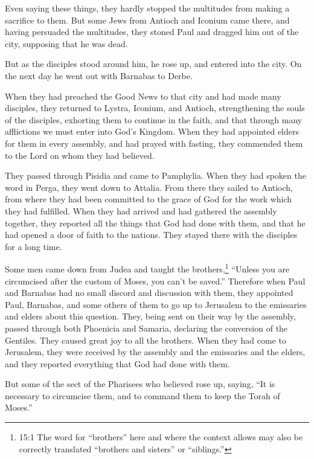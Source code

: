 \myverse{}Even saying these things, they hardly stopped the multitudes
from making a sacrifice to them.
\myverse{}But some Jews from Antioch and Iconium came there, and having persuaded the
multitudes, they stoned Paul and dragged him out of the city, supposing that he was dead.

\myverse{}But as the disciples stood around him, he rose up, and entered
into the city. On the next day he went out with Barnabas to Derbe.

\myverse{}When they had preached the Good News to that city and had made
many disciples, they returned to Lystra, Iconium, and Antioch,
\myverse{}strengthening the souls of the disciples, exhorting them to continue in the
faith, and that through many afflictions we must enter into God’s Kingdom.
\myverse{}When they had appointed elders for them in every assembly, and had prayed
with fasting, they commended them to the Lord on whom they had believed.

\myverse{}They passed through Pisidia and came to Pamphylia.
\myverse{}When they had spoken the word in Perga, they went down to Attalia.
\myverse{}From there they sailed to Antioch, from where they had been committed to
the grace of God for the work which they had fulfilled.
\myverse{}When they had arrived and had gathered the assembly together, they reported
all the things that God had done with them, and that he had opened a door of faith to the nations.
\myverse{}They stayed there with the disciples for a long time.


\mychapter{} \myverse*{}Some men came down from Judea and taught the brothers,\footnote{15:1 The word for “brothers” here and where the context allows may also be correctly translated “brothers
	and sisters” or “siblings.”} “Unless you are circumcised after the custom of Moses, you can’t
be saved.”
\myverse{}Therefore when Paul and Barnabas had no small discord and discussion with them,
they appointed Paul, Barnabas, and some others of them to go up to Jerusalem to the emissaries and elders
about this question.
\myverse{}They, being sent on their way by the assembly, passed through both Phoenicia
and Samaria, declaring the conversion of the Gentiles. They caused great joy to all the brothers.
\myverse{}When they had come to Jerusalem, they were received by the assembly and the
emissaries and the elders, and they reported everything that God had done with them.

\myverse{}But some of the sect of the Pharisees who believed rose up, saying,
“It is necessary to circumcise them, and to command them to keep the Torah of Moses.”

